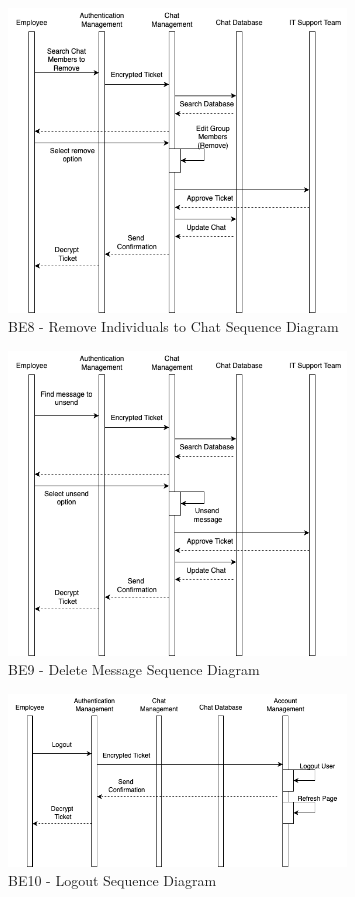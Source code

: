 \documentclass[]{article}
\begin{document}
\begin{figure}[H]
	\centering
	\includegraphics[width=0.8\textwidth]{BE8.png}
	\caption{BE8 - Remove Individuals to Chat Sequence Diagram}
\end{figure}

\begin{figure}[H]
	\centering
	\includegraphics[width=0.8\textwidth]{BE9.png}
	\caption{BE9 - Delete Message Sequence Diagram}
\end{figure}

\begin{figure}[H]
	\centering
	\includegraphics[width=0.8\textwidth]{BE10.png}
	\caption{BE10 - Logout Sequence Diagram}
\end{figure}
\end{document}
